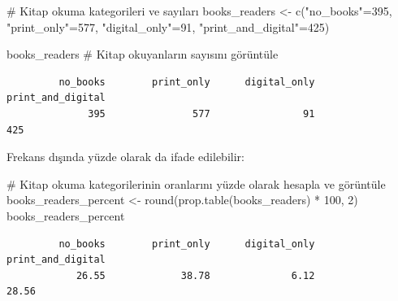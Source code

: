 \documentclass[
  letterpaper,
  DIV=11,
  numbers=noendperiod]{scrartcl}
\newenvironment{Shaded}{\begin{snugshade}}{\end{snugshade}}
\newcommand{\CommentTok}[1]{\textcolor[rgb]{0.37,0.37,0.37}{#1}}
\newcommand{\DecValTok}[1]{\textcolor[rgb]{0.68,0.00,0.00}{#1}}
\newcommand{\FunctionTok}[1]{\textcolor[rgb]{0.28,0.35,0.67}{#1}}
\newcommand{\NormalTok}[1]{\textcolor[rgb]{0.00,0.23,0.31}{#1}}
\newcommand{\OtherTok}[1]{\textcolor[rgb]{0.00,0.23,0.31}{#1}}
\newcommand{\SpecialCharTok}[1]{\textcolor[rgb]{0.37,0.37,0.37}{#1}}
\newcommand{\StringTok}[1]{\textcolor[rgb]{0.13,0.47,0.30}{#1}}
\begin{document}
\begin{Shaded}
\begin{Highlighting}[]
\CommentTok{\# Kitap okuma kategorileri ve sayıları}
\NormalTok{books\_readers }\OtherTok{\textless{}{-}} \FunctionTok{c}\NormalTok{(}\StringTok{"no\_books"}\OtherTok{=}\DecValTok{395}\NormalTok{, }\StringTok{"print\_only"}\OtherTok{=}\DecValTok{577}\NormalTok{, }\StringTok{"digital\_only"}\OtherTok{=}\DecValTok{91}\NormalTok{, }\StringTok{"print\_and\_digital"}\OtherTok{=}\DecValTok{425}\NormalTok{)}

\NormalTok{books\_readers  }\CommentTok{\# Kitap okuyanların sayısını görüntüle}
\end{Highlighting}
\end{Shaded}

\begin{verbatim}
         no_books        print_only      digital_only print_and_digital 
              395               577                91               425 
\end{verbatim}

Frekans dışında yüzde olarak da ifade edilebilir:

\begin{Shaded}
\begin{Highlighting}[]
\CommentTok{\# Kitap okuma kategorilerinin oranlarını yüzde olarak hesapla ve görüntüle}
\NormalTok{books\_readers\_percent }\OtherTok{\textless{}{-}} \FunctionTok{round}\NormalTok{(}\FunctionTok{prop.table}\NormalTok{(books\_readers) }\SpecialCharTok{*} \DecValTok{100}\NormalTok{, }\DecValTok{2}\NormalTok{)}
\NormalTok{books\_readers\_percent}
\end{Highlighting}
\end{Shaded}

\begin{verbatim}
         no_books        print_only      digital_only print_and_digital 
            26.55             38.78              6.12             28.56 
\end{verbatim}
\end{document}
